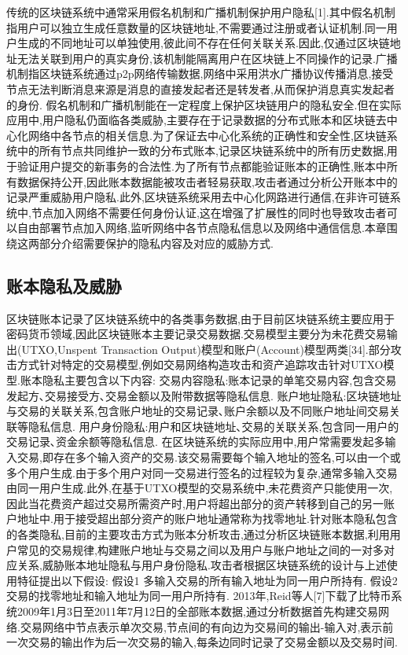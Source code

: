 传统的区块链系统中通常采用假名机制和广播机制保护用户隐私[1].其中假名机制指用户可以独立生成任意数量的区块链地址,不需要通过注册或者认证机制.同一用户生成的不同地址可以单独使用,彼此间不存在任何关联关系.因此,仅通过区块链地址无法关联到用户的真实身份,该机制能隔离用户在区块链上不同操作的记录.广播机制指区块链系统通过p2p网络传输数据,网络中采用洪水广播协议传播消息,接受节点无法判断消息来源是消息的直接发起者还是转发者,从而保护消息真实发起者的身份.
假名机制和广播机制能在一定程度上保护区块链用户的隐私安全.但在实际应用中,用户隐私仍面临各类威胁,主要存在于记录数据的分布式账本和区块链去中心化网络中各节点的相关信息.为了保证去中心化系统的正确性和安全性,区块链系统中的所有节点共同维护一致的分布式账本,记录区块链系统中的所有历史数据,用于验证用户提交的新事务的合法性.为了所有节点都能验证账本的正确性,账本中所有数据保持公开,因此账本数据能被攻击者轻易获取,攻击者通过分析公开账本中的记录严重威胁用户隐私.此外,区块链系统采用去中心化网路进行通信,在非许可链系统中,节点加入网络不需要任何身份认证,这在增强了扩展性的同时也导致攻击者可以自由部署节点加入网络,监听网络中各节点隐私信息以及网络中通信信息.本章围绕这两部分介绍需要保护的隐私内容及对应的威胁方式.

\subsection{账本隐私及威胁}

区块链账本记录了区块链系统中的各类事务数据,由于目前区块链系统主要应用于密码货币领域,因此区块链账本主要记录交易数据.交易模型主要分为未花费交易输出(UTXO,Unspent Transaction Output)模型和账户(Account)模型两类[34].部分攻击方式针对特定的交易模型,例如交易网络构造攻击和资产追踪攻击针对UTXO模型.账本隐私主要包含以下内容:
交易内容隐私:账本记录的单笔交易内容,包含交易发起方､交易接受方､交易金额以及附带数据等隐私信息.
账户地址隐私:区块链地址与交易的关联关系,包含账户地址的交易记录､账户余额以及不同账户地址间交易关联等隐私信息.
用户身份隐私:用户和区块链地址､交易的关联关系,包含同一用户的交易记录､资金余额等隐私信息.
在区块链系统的实际应用中,用户常需要发起多输入交易,即存在多个输入资产的交易.该交易需要每个输入地址的签名,可以由一个或多个用户生成.由于多个用户对同一交易进行签名的过程较为复杂,通常多输入交易由同一用户生成.此外,在基于UTXO模型的交易系统中,未花费资产只能使用一次,因此当花费资产超过交易所需资产时,用户将超出部分的资产转移到自己的另一账户地址中.用于接受超出部分资产的账户地址通常称为找零地址.针对账本隐私包含的各类隐私,目前的主要攻击方式为账本分析攻击,通过分析区块链账本数据,利用用户常见的交易规律,构建账户地址与交易之间以及用户与账户地址之间的一对多对应关系,威胁账本地址隐私与用户身份隐私.攻击者根据区块链系统的设计与上述使用特征提出以下假设:
假设1 多输入交易的所有输入地址为同一用户所持有.
假设2 交易的找零地址和输入地址为同一用户所持有.
2013年,Reid等人[7]下载了比特币系统2009年1月3日至2011年7月12日的全部账本数据,通过分析数据首先构建交易网络.交易网络中节点表示单次交易,节点间的有向边为交易间的输出-输入对,表示前一次交易的输出作为后一次交易的输入,每条边同时记录了交易金额以及交易时间.
 
